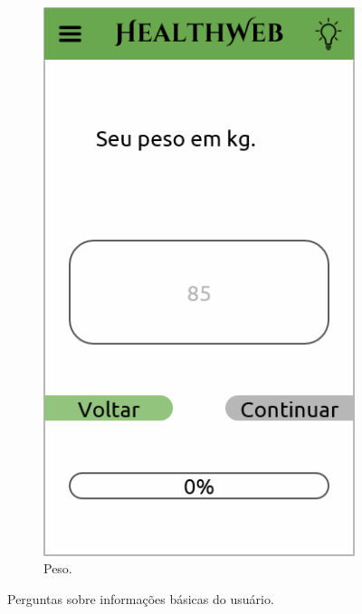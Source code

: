\begin{figure}[htbp]
\begin{subfigure}{0.24\linewidth}
		\includegraphics[width=\linewidth]{figure/prototype/mobile/weight.png}
		\caption{Peso.}
		\label{fig:mobile:weight}
	\end{subfigure}
	\caption{Perguntas sobre informações básicas do usuário.}
	\label{fig:mobile:bio_sex_age_height_weight}
\end{figure}

